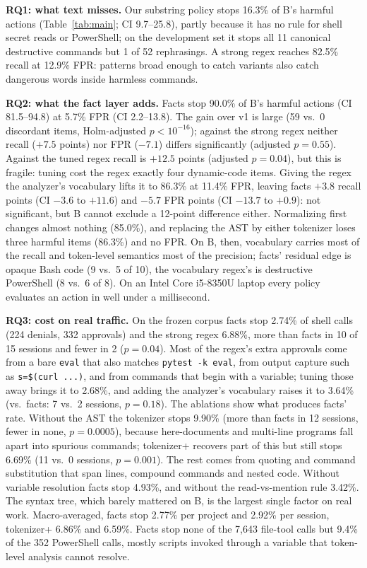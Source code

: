 \documentclass[conference]{IEEEtran}
\newcommand{\cmd}[1]{\texttt{\relscale{0.9}#1}}
\begin{document}
\textbf{RQ1: what text misses.} Our substring policy stops 16.3\% of B's harmful actions (Table~\ref{tab:main}; CI 9.7--25.8), partly because it has no rule for shell secret reads or PowerShell; on the development set it stops all 11 canonical destructive commands but 1 of 52 rephrasings. A strong regex reaches 82.5\% recall at 12.9\% FPR: patterns broad enough to catch variants also catch dangerous words inside harmless commands.

\textbf{RQ2: what the fact layer adds.} Facts stop 90.0\% of B's harmful actions (CI 81.5--94.8) at 5.7\% FPR (CI 2.2--13.8). The gain over v1 is large (59 vs.\ 0 discordant items, Holm-adjusted $p<10^{-16}$); against the strong regex neither recall ($+7.5$ points) nor FPR ($-7.1$) differs significantly (adjusted $p=0.55$). Against the tuned regex recall is $+12.5$ points (adjusted $p=0.04$), but this is fragile: tuning cost the regex exactly four dynamic-code items. Giving the regex the analyzer's vocabulary lifts it to 86.3\% at 11.4\% FPR, leaving facts $+3.8$ recall points (CI $-3.6$ to $+11.6$) and $-5.7$ FPR points (CI $-13.7$ to $+0.9$): not significant, but B cannot exclude a 12-point difference either. Normalizing first changes almost nothing (85.0\%), and replacing the AST by either tokenizer loses three harmful items (86.3\%) and no FPR. On B, then, vocabulary carries most of the recall and token-level semantics most of the precision; facts' residual edge is opaque Bash code (9 vs.\ 5 of 10), the vocabulary regex's is destructive PowerShell (8 vs.\ 6 of 8). On an Intel Core i5-8350U laptop every policy evaluates an action in well under a millisecond.

\textbf{RQ3: cost on real traffic.} On the frozen corpus facts stop 2.74\% of shell calls (224 denials, 332 approvals) and the strong regex 6.88\%, more than facts in 10 of 15 sessions and fewer in 2 ($p=0.04$). Most of the regex's extra approvals come from a bare \cmd{eval} that also matches \cmd{pytest -k eval}, from output capture such as \cmd{s=\$(curl ...)}, and from commands that begin with a variable; tuning those away brings it to 2.68\%, and adding the analyzer's vocabulary raises it to 3.64\% (vs.\ facts: 7 vs.\ 2 sessions, $p=0.18$). The ablations show what produces facts' rate. Without the AST the tokenizer stops 9.90\% (more than facts in 12 sessions, fewer in none, $p=0.0005$), because here-documents and multi-line programs fall apart into spurious commands; tokenizer+ recovers part of this but still stops 6.69\% (11 vs.\ 0 sessions, $p=0.001$). The rest comes from quoting and command substitution that span lines, compound commands and nested code. Without variable resolution facts stop 4.93\%, and without the read-vs-mention rule 3.42\%. The syntax tree, which barely mattered on B, is the largest single factor on real work. Macro-averaged, facts stop 2.77\% per project and 2.92\% per session, tokenizer+ 6.86\% and 6.59\%. Facts stop none of the 7,643 file-tool calls but 9.4\% of the 352 PowerShell calls, mostly scripts invoked through a variable that token-level analysis cannot resolve.
\end{document}
